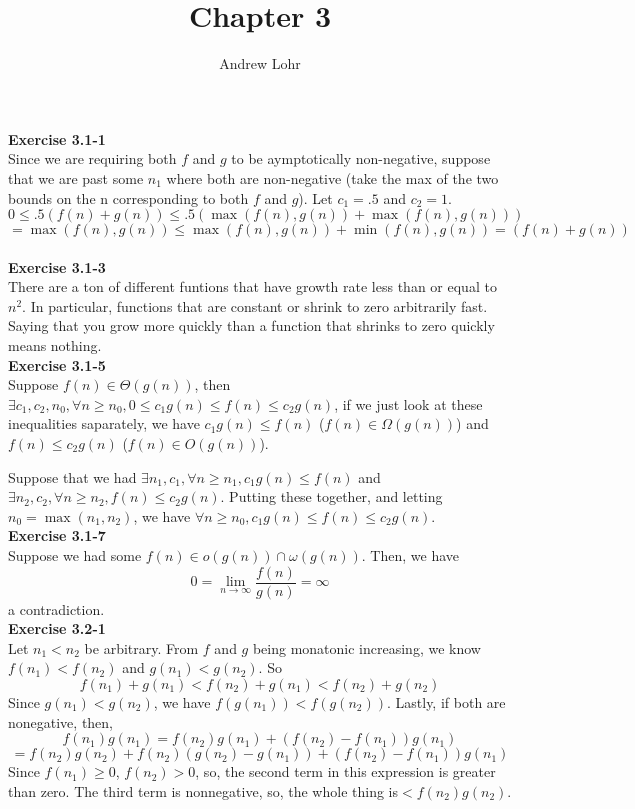 \documentclass{article}
\title{Chapter 3}
\author{Andrew Lohr}
\begin{document}
\maketitle

\noindent\textbf{Exercise 3.1-1}\\
Since we are requiring both $f$ and $g$ to be aymptotically non-negative, suppose that we are past some $n_1$ where both are non-negative (take the max of the two bounds on the n corresponding to both $f$ and $g$). Let $c_1=.5$ and $c_2=1$.
\[
0\le .5(f(n)+g(n)) \le .5(\max(f(n),g(n)) + \max(f(n),g(n))) \]\[= \max(f(n),g(n)) \le \max(f(n),g(n))+\min(f(n),g(n)) = (f(n)+g(n))
\]\\

\noindent\textbf{Exercise 3.1-3}\\

There are a ton of different funtions that have growth rate less than or equal to $n^2$. In particular, functions that are constant or shrink to zero arbitrarily fast. Saying that you grow more quickly than a function that shrinks to zero quickly means nothing. \\

\noindent\textbf{Exercise 3.1-5}\\

Suppose $f(n)\in \Theta(g(n))$, then $\exists c_1,c_2,n_0, \forall n\ge n_0, 0\le c_1 g(n) \le f(n) \le c_2 g(n)$, if we just look at these inequalities saparately, we have $c_1 g(n) \le f(n)$ ($f(n) \in \Omega(g(n))$) and $f(n) \le c_2 g(n)$ ($f(n)\in O(g(n))$).

Suppose that we had $\exists n_1, c_1, \forall n\ge n_1, c_1 g(n) \le f(n)$ and $\exists n_2,c_2, \forall n\ge n_2, f(n)\le c_2g(n)$. Putting these together, and letting $n_0 = \max(n_1,n_2)$, we have $\forall n\ge n_0, c_1 g(n) \le f(n) \le c_2 g(n)$. \\

\noindent\textbf{Exercise 3.1-7}\\

Suppose we had some $f(n) \in o(g(n)) \cap \omega(g(n))$. Then, we have
\[
0 = \lim_{n\rightarrow \infty} \frac{f(n)}{g(n)} = \infty
\]
a contradiction.\\

\noindent\textbf{Exercise 3.2-1}\\

Let $n_1 < n_2$ be arbitrary. From $f$ and $g$ being monatonic increasing, we know $f(n_1)< f(n_2)$ and $g(n_1) < g(n_2)$. So
\[
f(n_1)+g(n_1) < f(n_2) + g(n_1) < f(n_2)+g(n_2)
\]
Since $g(n_1)<g(n_2)$, we have $f(g(n_1))<f(g(n_2))$. Lastly, if both are nonegative, then, 
\[
f(n_1)g(n_1) = f(n_2)g(n_1) + (f(n_2)-f(n_1))g(n_1) \]\[= f(n_2)g(n_2) + f(n_2)(g(n_2)-g(n_1)) +(f(n_2)-f(n_1))g(n_1) 
\]
Since $f(n_1)\ge 0$, $f(n_2)>0$, so, the second term in this expression is greater than zero. The third term is nonnegative, so, the whole thing is$<f(n_2)g(n_2)$.\\
\end{document}
